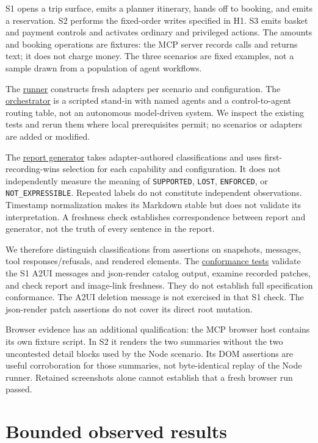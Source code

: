 \documentclass[11pt]{article}
\begin{document}
S1 opens a trip surface, emits a planner itinerary, hands off to
booking, and emits a reservation. S2 performs the fixed-order writes
specified in H1. S3 emits basket and payment controls and activates
ordinary and privileged actions. The amounts and booking operations are
fixtures: the MCP server records calls and returns text; it does not
charge money. The three scenarios are fixed examples, not a sample drawn
from a population of agent workflows.

The \href{../src/scenarios/run.ts}{runner} constructs fresh adapters per
scenario and configuration. The
\href{../src/orchestrator/orchestrator.ts}{orchestrator} is a scripted
stand-in with named agents and a control-to-agent routing table, not an
autonomous model-driven system. We inspect the existing tests and rerun
them where local prerequisites permit; no scenarios or adapters are
added or modified.

The \href{../src/report/generate.ts}{report generator} takes
adapter-authored classifications and uses first-recording-wins selection
for each capability and configuration. It does not independently measure
the meaning of \texttt{SUPPORTED}, \texttt{LOST}, \texttt{ENFORCED}, or
\texttt{NOT\_EXPRESSIBLE}. Repeated labels do not constitute independent
observations. Timestamp normalization makes its Markdown stable but does
not validate its interpretation. A freshness check establishes
correspondence between report and generator, not the truth of every
sentence in the report.

We therefore distinguish classifications from assertions on snapshots,
messages, tool responses/refusals, and rendered elements. The
\href{../tests/protocol/conformance.test.ts}{conformance tests} validate
the S1 A2UI messages and json-render catalog output, examine recorded
patches, and check report and image-link freshness. They do not
establish full specification conformance. The A2UI deletion message is
not exercised in that S1 check. The json-render patch assertions do not
cover its direct root mutation.

Browser evidence has an additional qualification: the MCP browser host
contains its own fixture script. In S2 it renders the two summaries
without the two uncontested detail blocks used by the Node scenario. Its
DOM assertions are useful corroboration for those summaries, not
byte-identical replay of the Node runner. Retained screenshots alone
cannot establish that a fresh browser run passed.

\section{Bounded observed results}\label{bounded-observed-results}
\end{document}
